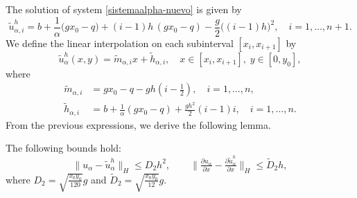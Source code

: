 \documentclass[axioms,article,submit,moreauthors]{Definitions/mdpi}
\newcommand\pder[2][]{\ensuremath{\tfrac{\partial#1}{\partial#2}}}
\begin{document}
  
  
The solution of system \eqref{sistemaalpha-nuevo} is given by
\begin{equation}
\label{eq:solucion_indices_alpha}
{\widetilde{u}^h_{\alpha,i}} =
b + \frac{1}{\alpha} \Big( g x_0 - q \Big)
+ (i-1) h \,(g x_0 - q) - \frac{g}{2} \big((i-1) h\big)^2,
\quad i=1,\dots,n+1.
\end{equation}
We define the linear interpolation on each subinterval $[x_i, x_{i+1}]$ by
\begin{equation}\label{uhalpha-nueva}
{\widetilde{u}^h_\alpha}(x,y) = \widetilde{m}_{\alpha,i} x + \widetilde{h}_{\alpha,i}, \quad x\in[x_i,x_{i+1}],\; y\in[0,y_0], 
\end{equation}
where
\begin{align}
\widetilde{m}_{\alpha,i} &= g x_0 - q - gh \left(i - \frac{1}{2}\right), \quad i=1,\dots,n,\\[2mm]
\widetilde{h}_{\alpha,i} &= b + \frac{1}{\alpha} (g x_0 - q ) + \frac{g h^2}{2} (i-1) i, \quad i=1,\dots,n.
\end{align}
From the previous expressions, we derive the following lemma.
\begin{Lemma} \label{Cota u uh alpha} The following bounds hold:
\[
\lVert u_\alpha - {\widetilde{u}^h_\alpha} \rVert_H \leq D_2 h^2, \qquad
\lVert \pder[u_\alpha]{x} - \pder[{\widetilde{u}^h_\alpha}]{x} \rVert_H \leq \widetilde{D}_2 h,
\]
where $D_2 = \sqrt{\frac{x_0 y_0}{120}} g$ and $\widetilde{D}_2 = \sqrt{\frac{x_0 y_0}{12}} g$.

\end{Lemma}
\end{document}
